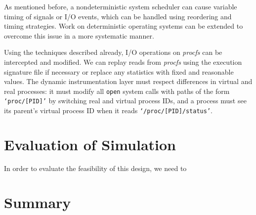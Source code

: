 As mentioned before, a nondeterministic system scheduler
can cause variable timing of signals
or I/O events, which
can be handled using reordering and
timing strategies.
Work on deterministic
operating systems can
be extended to overcome this issue
in a more systematic manner. \newline

 \newline
Using the techniques described
already, I/O operations on {\em procfs} can be intercepted
and modified. We can 
replay reads from {\em procfs} using the execution signature
file if necessary or replace any statistics with fixed and 
reasonable values. The dynamic instrumentation layer 
must respect differences in virtual and real processes:
it must modify all \texttt{open} system calls with paths
of the form \texttt{`proc/[PID]'}
by switching real and virtual process IDs,
and a process must see its 
parent's virtual process ID when it reads
\texttt{`/proc/[PID]/status'}.










\section{Evaluation of Simulation} \label{sileval}
In order to evaluate the feasibility of this design,
we need to 
\section {Summary}

